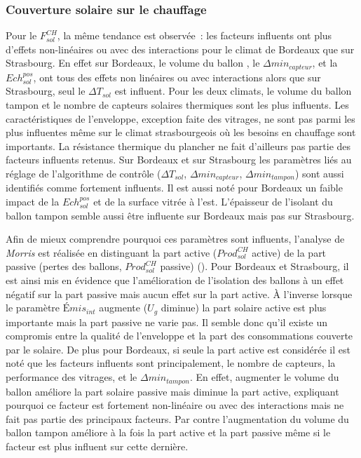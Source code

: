 \subsubsection{Couverture solaire sur le chauffage} %
\label{ssub:couverture_solaire_sur_le_chauffage}
Pour le $F_{sol}^{CH}$, la même tendance est observée~: les facteurs influents ont plus
d’effets non-linéaires ou avec des interactions pour le climat de Bordeaux que sur
Strasbourg. En effet sur Bordeaux, le volume du ballon , le $\Delta
min_{capteur}$, et la $Ech_{sol}^{pos}$, ont tous des effets non linéaires ou avec
interactions alors que sur Strasbourg, seul le $\Delta T_{sol}$ est influent. Pour les
deux climats, le volume du ballon tampon et le nombre de capteurs solaires thermiques sont
les plus influents. Les caractéristiques de l’enveloppe, exception faite
des vitrages, ne sont pas parmi les plus influentes même sur le climat strasbourgeois où
les besoins en chauffage sont importants. La résistance thermique du plancher ne fait d’ailleurs
pas partie des facteurs influents retenus.
Sur Bordeaux et sur Strasbourg les
paramètres liés au réglage de l’algorithme de contrôle ($\Delta T_{sol}$, $\Delta
min_{capteur}$, $\Delta min_{tampon}$) sont aussi identifiés comme fortement influents. Il
est aussi noté pour Bordeaux un faible impact de la $Ech_{sol}^{pos}$ et de la surface
vitrée à l’est. L’épaisseur de l’isolant du ballon tampon semble aussi être influente sur
Bordeaux mais pas sur Strasbourg.

Afin de mieux comprendre pourquoi ces paramètres sont influents, l’analyse de
\textit{Morris} est réalisée en distinguant la part active ($Prod_{sol}^{CH}$ active) de
la part passive (pertes des ballons, $Prod_{sol}^{CH}$ passive) ().
Pour Bordeaux et Strasbourg, il est ainsi mis en
évidence que l’amélioration de l’isolation des ballons à un effet négatif sur la part
passive mais aucun effet sur la part active. À l’inverse lorsque le paramètre
$Émis_{int}$ augmente ($U_{g}$ diminue) la part solaire active est plus importante mais la
part passive ne varie pas. Il semble donc qu’il existe un compromis entre la qualité de
l’enveloppe et la part des consommations couverte par le solaire. De plus pour Bordeaux,
si seule la part active est considérée il est noté que les facteurs influents sont
principalement, le nombre de capteurs, la performance des vitrages, et le $\Delta min_{tampon}$.
En effet, augmenter le volume du ballon  améliore la part solaire
passive mais diminue la part active, expliquant pourquoi ce facteur est fortement
non-linéaire ou avec des interactions mais ne fait pas partie des principaux facteurs. Par
contre l’augmentation du volume du ballon tampon améliore à la fois la part active et la
part passive même si le facteur est plus influent sur cette dernière.

